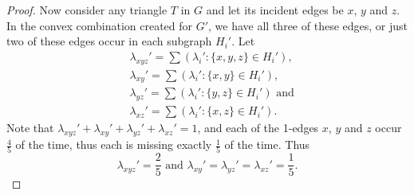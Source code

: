 \documentclass[oneeqnum,final]{siamltex1213}
\begin{document}
\begin{proof}
Now consider any triangle $T$ in $G$ and let its incident edges be $x$, $y$ and $z$. In the convex combination created for $G'$, we have all three of these edges, or just two of these edges occur in each subgraph $H_{i}'$. Let 
\begin{equation*}
\begin{split}
&\lambda_{xyz}'=\sum(\lambda_{i}':\{x, y, z\}\in H_{i}') \text{,} \\
&\lambda_{xy}'=\sum(\lambda_{i}':\{x, y\}\in H_{i}') \text{,} \\
&\lambda_{yz}'=\sum(\lambda_{i}':\{y, z\}\in H_{i}') \text{ and} \\
&\lambda_{xz}'=\sum(\lambda_{i}':\{x, z\}\in H_{i}') \text{.}
\end{split}
\end{equation*}
Note that $\lambda_{xyz}' + \lambda_{xy}' + \lambda_{yz}' + \lambda_{xz}' = 1$, and each of the 1-edges $x$, $y$ and $z$ occur $\frac{4}{5}$ of the time, thus each is missing exactly $\frac{1}{5}$ of the time. Thus
\begin{equation} \label{newLambdas}
\lambda_{xyz}'=\frac{2}{5} \text{ and }\lambda_{xy}' = \lambda_{yz}' = \lambda_{xz}' = \frac{1}{5}\text{.}
\end{equation}


\end{proof}
\end{document}

